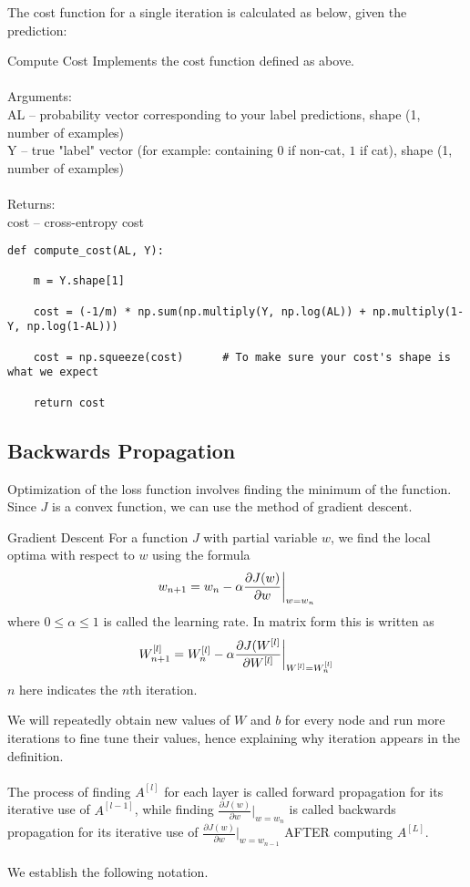 \documentclass[a4paper]{article}
\begin{document}
\begin{enumerate}
The cost function for a single iteration is calculated as below, given the prediction: 

\begin{alg}{Compute Cost}{} Implements the cost function defined as above. \\~\\
Arguments: \\
AL -- probability vector corresponding to your label predictions, shape (1, number of examples)\\
Y -- true "label" vector (for example: containing $0$ if non-cat, $1$ if cat), shape (1, number of examples)\\~\\

Returns: \\
cost  -- cross-entropy cost
\begin{verbatim}
def compute_cost(AL, Y):

    m = Y.shape[1]

    cost = (-1/m) * np.sum(np.multiply(Y, np.log(AL)) + np.multiply(1-Y, np.log(1-AL)))
    
    cost = np.squeeze(cost)      # To make sure your cost's shape is what we expect

    return cost
\end{verbatim}
\end{alg}

\subsection{Backwards Propagation}
Optimization of the loss function involves finding the minimum of the function. Since $J$ is a convex function, we can use the method of gradient descent. 

\begin{defn}{Gradient Descent}{} For a function $J$ with partial variable $w$, we find the local optima with respect to $w$ using the formula $$w_{n+1}=w_n-\alpha\frac{\partial J(w)}{\partial w}\bigg{|}_{w=w_n}$$ where $0\leq\alpha\leq 1$ is called the learning rate. In matrix form this is written as $$W_{n+1}^{[l]}=W_n^{[l]}-\alpha\frac{\partial J(W^{[l]}}{\partial W^{[l]}}\bigg{|}_{W^{[l]}=W_n^{[l]}}$$ $n$ here indicates the $n$th iteration. 
\end{defn}

We will repeatedly obtain new values of $W$ and $b$ for every node and run more iterations to fine tune their values, hence explaining why iteration appears in the definition. \\~\\
The process of finding $A^{[l]}$ for each layer is called forward propagation for its iterative use of $A^{[l-1]}$, while finding $\frac{\partial J(w)}{\partial w}|_{w=w_n}$ is called backwards propagation for its iterative use of $\frac{\partial J(w)}{\partial w}|_{w=w_{n-1}}$ AFTER computing $A^{[L]}$. \\~\\ We establish the following notation. 


\end{enumerate}
\end{document}
